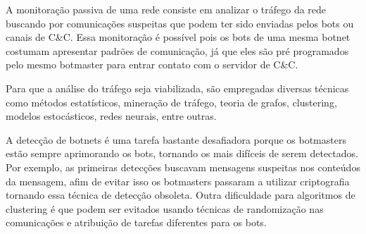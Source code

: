A monitoração passiva de uma rede consiste em analizar o tráfego da rede buscando por comunicações suspeitas que podem ter sido enviadas pelos bots ou canais de C\&C. Essa monitoração é possível pois os bots de uma mesma botnet costumam apresentar padrões de comunicação, já que eles são pré programados pelo mesmo botmaster para entrar contato com o servidor de C\&C.

Para que a análise do tráfego seja viabilizada, são empregadas diversas técnicas como métodos estatísticos, mineração de tráfego, teoria de grafos, clustering, modelos estocásticos, redes neurais, entre outras.

A detecção de botnets é uma tarefa bastante desafiadora porque os botmasters estão sempre aprimorando os bots, tornando os mais difíceis de serem detectados. Por exemplo, as primeiras detecções buscavam mensagens suspeitas nos conteúdos da mensagem, afim de evitar isso os botmasters passaram a utilizar criptografia tornando essa técnica de detecção obsoleta. Outra dificuldade para algoritmos de clustering é que podem ser evitados usando técnicas de randomização nas comunicações e atribuição de tarefas diferentes para os bots.